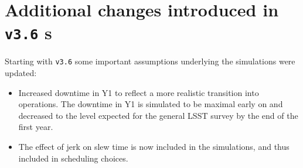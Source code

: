 \section{Additional changes introduced in \texttt{v3.6} \opsim s }\label{sec:opsimchanges}
Starting with \texttt{v3.6} some important assumptions underlying the simulations were updated: 
\begin{itemize}
\item Increased downtime in Y1 to reflect a more realistic transition into operations. The downtime in Y1 is simulated to be maximal early on and decreased to the level expected for the general LSST survey by the end of the first year. 
\item The effect of jerk on slew time is now included in the simulations, and thus included in scheduling choices.
\end{itemize}

